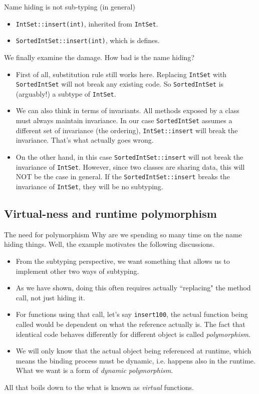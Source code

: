 \begin{frame}[fragile]{Name hiding is not sub-typing (in general)}
\begin{itemize}
	\item \texttt{IntSet::insert(int)}, inherited from \texttt{IntSet}.
	\item \texttt{SortedIntSet::insert(int)}, which is defines.
\end{itemize}
We finally examine the damage. How bad is the name hiding? 
\begin{itemize}
	\item First of all, substitution rule still works here. Replacing \texttt{IntSet} with \texttt{SortedIntSet} will not break any existing code. So \texttt{SortedIntSet} is (arguably!) a subtype of \texttt{IntSet}.
	\item We can also think in terms of invariants. All methods exposed by a class must always maintain invariance. In our case \texttt{SortedIntSet} assumes a different set of invariance (the ordering),  \texttt{IntSet::insert} will break the invariance. That's what actually goes wrong. 
	\item On the other hand, in this case \texttt{SortedIntSet::insert} will not break the invariance of \texttt{IntSet}. However, since two classes are sharing data, this will NOT be the case in general. If the \texttt{SortedIntSet::insert} breaks the invariance of \texttt{IntSet}, they will be no subtyping. 
\end{itemize}
\end{frame}

\subsection{Virtual-ness and runtime polymorphism}
\begin{frame}{The need for polymorphism}
Why are we spending so many time on the name hiding things. Well, the example motivates the following discussions. 
\begin{itemize}
	\item From the subtyping perspective, we want something that allows us to implement other two ways of subtyping. 
	\item As we have shown, doing this often requires actually ``replacing" the method call, not just hiding it. 
	\item For functions using that call, let's say \texttt{insert100}, the actual function being called would be dependent on what the reference actually is. The fact that identical code behaves differently for different object is called \textit{polymorphism}.
	\item We will only know that the actual object being referenced at runtime, which means the binding process must be dynamic, i.e. happens also in the runtime. What we want is a form of \textit{dynamic polymorphism}.
\end{itemize}
All that boils down to the what is known as \textit{virtual} functions.
\end{frame}

